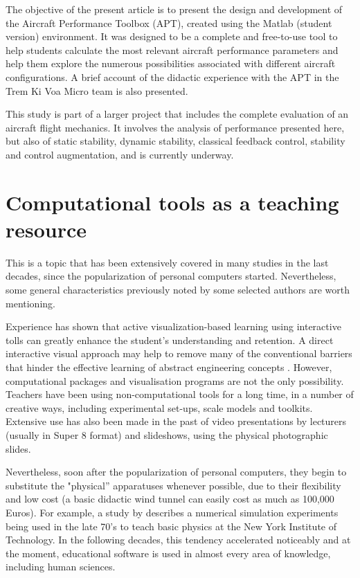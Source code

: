\documentclass[10pt]{SelfArx} %
\begin{document}
The objective of the present  article is to present the design and development of the Aircraft Performance Toolbox (APT), created using the Matlab\textsuperscript{\textregistered} (student version) environment. It was designed to be a complete and free-to-use tool to help students calculate the most relevant aircraft performance parameters and  help them explore the numerous possibilities associated with different aircraft configurations. A brief account of the didactic experience with the APT in the Trem Ki Voa Micro team is also presented. 

This study is part of a larger project that includes the complete evaluation of an aircraft flight mechanics. It involves the analysis of performance presented here, but also of static stability, dynamic stability, classical feedback control, stability and control augmentation, and is currently underway. 


\section{Computational tools as a teaching resource}
This is a topic that has been extensively covered in many studies in the last decades, since the popularization of personal computers started. Nevertheless, some general characteristics previously noted by some selected authors  are worth mentioning. 

Experience has shown that active visualization-based learning using interactive tolls can greatly enhance the student's understanding and retention. A direct interactive visual approach  may help to remove many of the conventional barriers that hinder the effective learning of  abstract engineering concepts \cite{wideberg}. However,  computational packages and visualisation programs are not the only possibility.  Teachers have been using non-computational tools for a long time, in a  number of creative ways, including experimental set-ups, scale models and toolkits. Extensive use has also been made in the past of video presentations by lecturers  (usually in Super 8 format)  and slideshows, using the physical photographic slides. 

Nevertheless, soon after the popularization of  personal computers, they begin to substitute the "physical'' apparatuses whenever possible, due to their flexibility and  low cost (a basic didactic wind tunnel can easily cost as much as  100,000 Euros). For example, a study by \cite{wolff} describes a numerical simulation experiments being used in the late 70's to teach basic physics  at the New York Institute of Technology. In the following decades, this tendency accelerated noticeably and at the moment, educational software is used in  almost every area of knowledge, including human sciences.  
\end{document}
